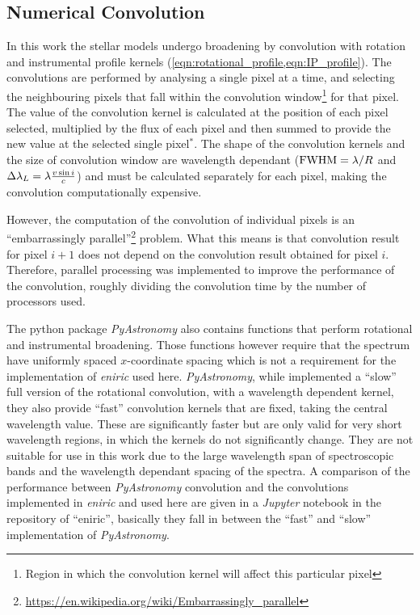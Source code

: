{\subsection{Numerical Convolution}
\label{subsec:numerical_convolution}
In this work the stellar models undergo broadening by convolution with rotation and instrumental profile kernels (\cref{eqn:rotational_profile,eqn:IP_profile}).
The convolutions are performed by analysing a single pixel at a time, and selecting the neighbouring pixels that fall within the convolution window\footnote{Region in which the convolution kernel will affect this particular pixel} for that pixel.
The value of the convolution kernel is calculated at the position of each pixel selected, multiplied by the flux of each pixel and then summed to provide the new value at the selected single pixel{$^{\textbf{*}}$}.
The shape of the convolution kernels and the size of convolution window are wavelength dependant (${\textrm{FWHM}}=\lambda / R$ and $\Delta\lambda_{L}=\lambda \frac{v\sin{i}}{c}$) and must be calculated separately for each pixel, making the convolution computationally expensive.

However, the computation of the convolution of individual pixels is an ``embarrassingly parallel''\footnote{\href{https://en.wikipedia.org/wiki/Embarrassingly\_parallel}{https://en.wikipedia.org/wiki/Embarrassingly\_parallel}} problem.
What this means is that convolution result for pixel $i+1$ does not depend on the convolution result obtained for pixel $i$.
Therefore, parallel processing was implemented to improve the performance of the convolution, roughly dividing the convolution time by the number of processors used.

The python package \emph{PyAstronomy} also contains functions that perform rotational and instrumental broadening.
Those functions however require that the spectrum have uniformly spaced $x$-coordinate spacing which is not a requirement for the implementation of \emph{eniric} used here.
\emph{PyAstronomy}, while implemented a ``slow'' full version of the rotational convolution, with a wavelength dependent kernel, they also provide ``fast'' convolution kernels that are fixed, taking the central wavelength value.
These are significantly faster but are only valid for very short wavelength regions, in which the kernels do not significantly change.
They are not suitable for use in this work due to the large wavelength span of spectroscopic bands and the wavelength dependant spacing of the spectra.
A comparison of the performance between \emph{PyAstronomy} convolution and the convolutions implemented in \emph{eniric} and used here are given in a \emph{Jupyter} notebook in the repository of ``eniric'', basically they fall in between the ``fast'' and ``slow'' implementation of \emph{PyAstronomy}.

}
